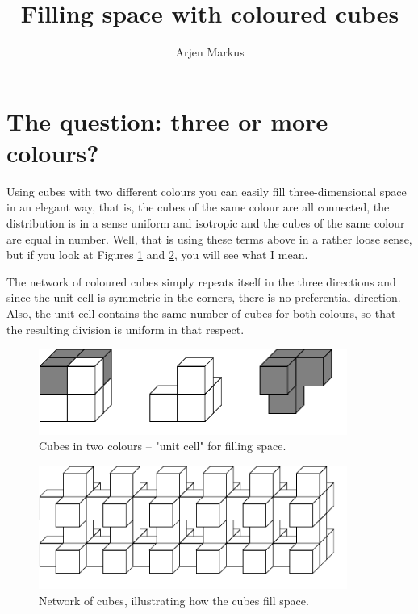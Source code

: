 \documentclass[onecolumn]{article}
\begin{document}
\title{Filling space with coloured cubes}

\author{Arjen Markus}

\maketitle

\section*{The question: three or more colours?}
Using cubes with two different colours you can easily fill three-dimensional space
in an elegant way, that is, the cubes of the same colour are all connected, the
distribution is in a sense uniform and isotropic and the cubes of the same colour are
equal in number. Well, that is using these terms above in a rather loose sense, but if you
look at Figures \ref{two_colours} and \ref{network_two_colours}, you will see what I mean.

The network of coloured cubes simply repeats itself in the three directions and since the
unit cell is symmetric in the corners, there is no preferential direction. Also, the unit
cell contains the same number of cubes for both colours, so that the resulting division is uniform
in that respect.

\begin{figure}
\center
\caption{Cubes in two colours -- "unit cell" for filling space.}
\label{two_colours}
\includegraphics[width=0.9\textwidth]{two_colours.pdf}
\end{figure}

\begin{figure}
\center
\caption{Network of cubes, illustrating how the cubes fill space.}
\label{network_two_colours}
\includegraphics[width=0.9\textwidth]{network_two_colours.pdf}
\end{figure}
\end{document}
